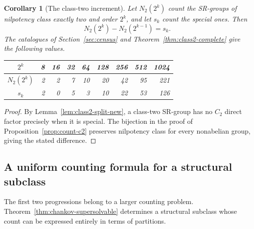 \documentclass[11pt,a4paper]{amsart}
\newtheorem{corl}[thm]{Corollary}
\theoremstyle{definition}
\theoremstyle{remark}
\numberwithin{equation}{section}
\begin{document}
\begin{corl}[The class-two increment]\label{cor:class2-count-increment}
Let $N_2(2^k)$ count the SR-groups of nilpotency class exactly two and
order $2^k$, and let $s_k$ count the special ones. Then
\begin{equation}\label{eq:class2-count-increment}
 N_2(2^k)-N_2(2^{k-1})=s_k.
\end{equation}
The catalogues of Section~\ref{sec:census} and
Theorem~\ref{thm:class2-complete} give the following values.
\begin{center}
\begin{tabular}{c|rrrrrrrr}
\toprule
$2^k$&8&16&32&64&128&256&512&1024\\\midrule
$N_2(2^k)$&2&2&7&10&20&42&95&221\\
$s_k$&2&0&5&3&10&22&53&126\\\bottomrule
\end{tabular}
\end{center}
\end{corl}
\begin{proof}
By Lemma~\ref{lem:class2-split-new}, a class-two SR-group has no $C_2$
direct factor precisely when it is special. The bijection in the proof
of Proposition~\ref{prop:count-c2} preserves nilpotency class for every
nonabelian group, giving the stated difference.
\end{proof}


\subsection{A uniform counting formula for a structural subclass}
The first two progressions belong to a larger counting problem.
Theorem~\ref{thm:chankov-supersolvable} determines a structural
subclass whose count can be expressed entirely in terms of partitions.
\end{document}
